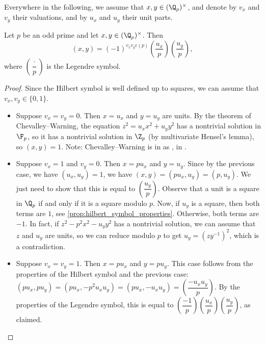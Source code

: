 Everywhere in the following, we assume that $x, y \in (\Q_p)^\times$, and denote by $v_x$ and $v_y$
their valuations, and by $u_x$ and $u_y$ their unit parts.

\begin{theorem}
	\label{thm:padic_odd_p}
	\leanok
Let $p$ be an odd prime and let $x,y \in (\Q_p)^\times$. Then
\[(x,y) = (-1)^{v_x v_y\epsilon(p)}\left(\dfrac{u_x}{p}\right) \left(\dfrac{u_y}{p}\right),\]
where $\left(\dfrac{\cdot}{p}\right)$ is the Legendre symbol.
\end{theorem}

\begin{proof}
	Since the Hilbert symbol is well defined up to squares, we can assume that $v_x, v_y \in \{0, 1\}$.
	\begin{itemize}
		\item Suppose $v_x=v_y=0$. Then $x=u_x$ and $y=u_y$ are units. By the theorem of Chevalley--Warning,
		the equation $z^2 = u_x x^2 + u_y y^2$ has a nontrivial solution in $\F_p$, so it has a
		nontrivial solution in $\Z_p$ (by multivariate Hensel's lemma), so $(x,y)=1$.
		Note: Chevalley--Warning is in \mathlib as , in .
		\item Suppose $v_x=1$ and $v_y=0$. Then $x=p u_x$ and $y=u_y$. Since by the previous case, we
		have $(u_x, u_y)=1$, we have $(x,y) = (p u_x, u_y) = (p, u_y)$. We just need to show that this is
		equal to $\left(\dfrac{u_y}{p}\right)$. Observe that a unit is a square in $\Q_p$ if and only if
		it is a square modulo $p$. Now, if $u_y$ is a square, then both terms are $1$, see
		\ref{prop:hilbert_symbol_properties}. Otherwise, both terms are $-1$. In fact,
		if $z^2-p^2x^2-u_yy^2$ has a nontrivial solution, we can assume that $z$ and $u_y$ are units, so
		we can reduce modulo $p$ to get $u_y = (zy^{-1})^2$, which is a contradiction.
		\item Suppose $v_x=v_y=1$. Then $x=p u_x$ and $y=p u_y$. This case follows from the properties of
		the Hilbert symbol and the previous case: $(pu_x,pu_y)=(pu_x, -p^2u_xu_y)= (pu_x, -u_xu_y)=
		\left(\dfrac{-u_xu_y}{p}\right)$. By the properties of the Legendre symbol, this is equal to
		$\left(\dfrac{-1}{p}\right)\left(\dfrac{u_x}{p}\right)\left(\dfrac{u_y}{p}\right)$, as claimed.
	\end{itemize}
\end{proof}

